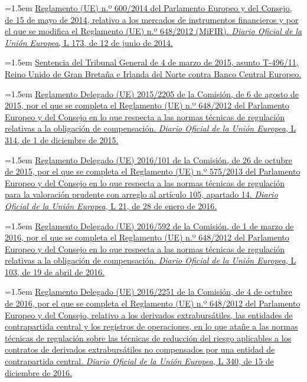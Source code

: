 \documentclass[10pt,a4paper]{article}
\begin{document}
\noindent\hangindent=1.5em \href{https://eur-lex.europa.eu/eli/reg/2014/600/oj}{Reglamento (UE) n.º 600/2014 del Parlamento Europeo y del Consejo, de 15 de mayo de 2014, relativo a los mercados de instrumentos financieros y por el que se modifica el Reglamento (UE) n.º 648/2012 (MiFIR). \textit{Diario Oficial de la Unión Europea}, L 173, de 12 de junio de 2014.}

\noindent\hangindent=1.5em \href{https://eur-lex.europa.eu/legal-content/ES/TXT/?uri=CELEX:62011TJ0496}{Sentencia del Tribunal General de 4 de marzo de 2015, asunto T-496/11, Reino Unido de Gran Bretaña e Irlanda del Norte contra Banco Central Europeo.}

\noindent\hangindent=1.5em \href{https://eur-lex.europa.eu/eli/reg_del/2015/2205/oj}{Reglamento Delegado (UE) 2015/2205 de la Comisión, de 6 de agosto de 2015, por el que se completa el Reglamento (UE) n.º 648/2012 del Parlamento Europeo y del Consejo en lo que respecta a las normas técnicas de regulación relativas a la obligación de compensación. \textit{Diario Oficial de la Unión Europea}, L 314, de 1 de diciembre de 2015.}

\noindent\hangindent=1.5em \href{https://eur-lex.europa.eu/eli/reg/2016/101/oj}{Reglamento Delegado (UE) 2016/101 de la Comisión, de 26 de octubre de 2015, por el que se completa el Reglamento (UE) n.º 575/2013 del Parlamento Europeo y del Consejo en lo que respecta a las normas técnicas de regulación para la valoración prudente con arreglo al artículo 105, apartado 14. \textit{Diario Oficial de la Unión Europea}, L 21, de 28 de enero de 2016.}

\noindent\hangindent=1.5em \href{https://eur-lex.europa.eu/eli/reg_del/2016/592/oj}{Reglamento Delegado (UE) 2016/592 de la Comisión, de 1 de marzo de 2016, por el que se completa el Reglamento (UE) n.º 648/2012 del Parlamento Europeo y del Consejo en lo que respecta a las normas técnicas de regulación relativas a la obligación de compensación. \textit{Diario Oficial de la Unión Europea}, L 103, de 19 de abril de 2016.}

\noindent\hangindent=1.5em \href{https://eur-lex.europa.eu/eli/reg_del/2016/2251/oj}{Reglamento Delegado (UE) 2016/2251 de la Comisión, de 4 de octubre de 2016, por el que se completa el Reglamento (UE) n.º 648/2012 del Parlamento Europeo y del Consejo, relativo a los derivados extrabursátiles, las entidades de contrapartida central y los registros de operaciones, en lo que atañe a las normas técnicas de regulación sobre las técnicas de reducción del riesgo aplicables a los contratos de derivados extrabursátiles no compensados por una entidad de contrapartida central. \textit{Diario Oficial de la Unión Europea}, L 340, de 15 de diciembre de 2016.}
\end{document}
